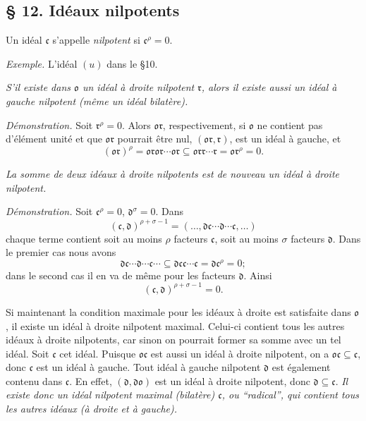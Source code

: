 
\providecommand{\mo}{\mathfrak{o}}
\providecommand{\mc}{\mathfrak{c}}
\providecommand{\mC}{\mathfrak{C}}
\providecommand{\md}{\mathfrak{d}}
\providecommand{\mr}{\mathfrak{r}}
\providecommand{\mZ}{\mathfrak{Z}}

\subsection*{\S{} 12. Idéaux nilpotents}

Un idéal $\mc$ s'appelle \emph{nilpotent} si $\mc^\rho=0$.

\emph{Exemple.} L'idéal $(u)$ dans le \S{}10.

\emph{S'il existe dans $\mo$ un idéal à droite nilpotent $\mr$, alors il existe aussi un idéal à gauche nilpotent (même un idéal bilatère).}

\emph{Démonstration.} Soit $\mr^\rho=0$. Alors $\mo\mr$, respectivement, si $\mo$ ne contient pas d'élément unité et que $\mo\mr$ pourrait être nul, $(\mo\mr,\mr)$, est un idéal à gauche, et
\[
        (\mo\mr)^\rho=\mo\mr\mo\mr\cdots\mo\mr\subseteq\mo\mr\mr\cdots\mr=\mo\mr^\rho=0.
\]

\emph{La somme de deux idéaux à droite nilpotents est de nouveau un idéal à droite nilpotent.}

\emph{Démonstration.} Soit $\mc^\rho=0$, $\md^\sigma=0$. Dans
\[
        (\mc,\md)^{\rho+\sigma-1}=(\ldots,\md\mc\cdots\md\cdots\mc,\ldots)
\]
chaque terme contient soit au moins $\rho$ facteurs $\mc$, soit au moins $\sigma$ facteurs $\md$. Dans le premier cas nous avons
\[
        \md\mc\cdots\md\cdots\mc\cdots\subseteq\md\mc\mc\cdots\mc=\md\mc^\rho=0;
\]
dans le second cas il en va de même pour les facteurs $\md$. Ainsi
\[
        (\mc,\md)^{\rho+\sigma-1}=0.
\]

Si maintenant la condition maximale pour les idéaux à droite est satisfaite dans $\mo$, il existe un idéal à droite nilpotent maximal. Celui-ci contient tous les autres idéaux à droite nilpotents, car sinon on pourrait former sa somme avec un tel idéal. Soit $\mc$ cet idéal. Puisque $\mo\mc$ est aussi un idéal à droite nilpotent, on a $\mo\mc\subseteq\mc$, donc $\mc$ est un idéal à gauche. Tout idéal à gauche nilpotent $\md$ est également contenu dans $\mc$. En effet, $(\md,\md\mo)$ est un idéal à droite nilpotent, donc $\md\subseteq\mc$. \emph{Il existe donc un idéal nilpotent maximal (bilatère) $\mc$, ou ``radical'', qui contient tous les autres idéaux (à droite et à gauche).}

